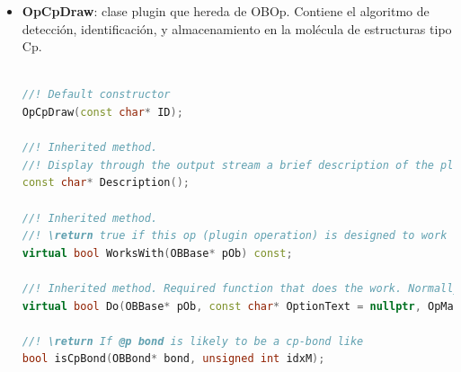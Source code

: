 \begin{itemize}
\begin{lstlisting}[language=C++]
unsigned int _idx;                          //!< Block identifier
std::vector<unsigned int> vidx_atoms;       //!< Vector idx of the atoms that are part of the block.

        public: 

//! Default constructor
BranchBlock();

//! Destructor
~BranchBlock();

//! \return the size of the block (number of atoms in the block)
int Size();

//! \return the block identifier
unsigned int GetIdx();

//! Set the block identifier
void SetIdx(int idx);

//! Add an atom's idx to the block
void AddAtom(int i);

//! \return the idx of the atom at position @p i. Zero based access.
unsigned int GetAtomIdx(int i);

//! \return Whether the @p idx exists within the atoms already inserted in the block
bool HasAtom(int idx);

//! Cp will be possible if all the elements in the block are carbons up to that point and have a bond with an ogm metal.
//! \return whether or not it appears to be a Cp block
bool IsPossibleCp(OBMol &mol)
    \end{lstlisting}


    \item \textbf{OpCpDraw}: clase plugin que hereda de OBOp. Contiene el algoritmo de detección, identificación, y almacenamiento en la molécula de estructuras tipo Cp.
    \begin{lstlisting}[language=C++]

//! Default constructor
OpCpDraw(const char* ID);

//! Inherited method. 
//! Display through the output stream a brief description of the plugin.
const char* Description();

//! Inherited method. 
//! \return true if this op (plugin operation) is designed to work with the class of @p pOb, e.g. OBMol
virtual bool WorksWith(OBBase* pOb) const;

//! Inherited method. Required function that does the work. Normally return true, unless object is not to be output. 
virtual bool Do(OBBase* pOb, const char* OptionText = nullptr, OpMap* pOptions = nullptr, OBConversion* pConv = nullptr);

//! \return If @p bond is likely to be a cp-bond like
bool isCpBond(OBBond* bond, unsigned int idxM);


\end{lstlisting}
\end{itemize}
